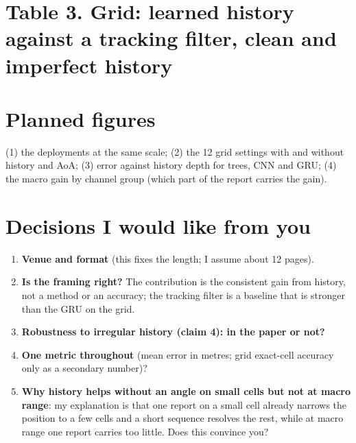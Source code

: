 \documentclass[10pt]{article}
\begin{document}
\section*{Table 3. Grid: learned history against a tracking filter, clean and imperfect history}
\begin{center}\small\resizebox{\textwidth}{!}{}\end{center}
\vspace{-6pt}{\footnotesize $15\times15$ grid, mixed propagation, BS beyond the corner, RSS and SINR only. Mean position error in metres.}

\section*{Planned figures}
(1) the deployments at the same scale; (2) the 12 grid settings with and without history and AoA; (3) error against history depth for trees, CNN and GRU; (4) the macro gain by channel group (which part of the report carries the gain).

\section*{Decisions I would like from you}
\begin{enumerate}
\item \textbf{Venue and format} (this fixes the length; I assume about 12 pages).
\item \textbf{Is the framing right?} The contribution is the consistent gain from history, not a method or an accuracy; the tracking filter is a baseline that is stronger than the GRU on the grid.
\item \textbf{Robustness to irregular history (claim 4): in the paper or not?}
\item \textbf{One metric throughout} (mean error in metres; grid exact-cell accuracy only as a secondary number)?
\item \textbf{Why history helps without an angle on small cells but not at macro range}: my explanation is that one report on a small cell already narrows the position to a few cells and a short sequence resolves the rest, while at macro range one report carries too little. Does this convince you?
\end{enumerate}
\end{document}
